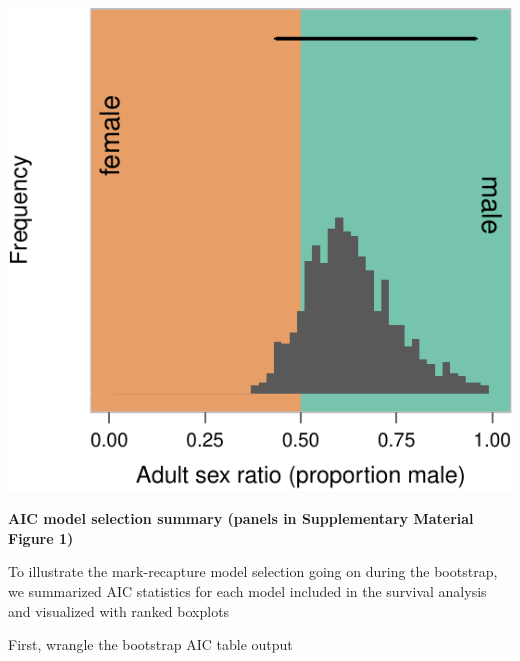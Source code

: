 \documentclass[]{article}
\begin{document}
\begin{center}\includegraphics{Ceuta_ASR_Matrix_Modeling_files/figure-latex/unnamed-chunk-53-1} \end{center}

\textbf{AIC model selection summary (panels in Supplementary Material
Figure 1)}

To illustrate the mark-recapture model selection going on during the
bootstrap, we summarized AIC statistics for each model included in the
survival analysis and visualized with ranked boxplots

First, wrangle the bootstrap AIC table output
\end{document}
